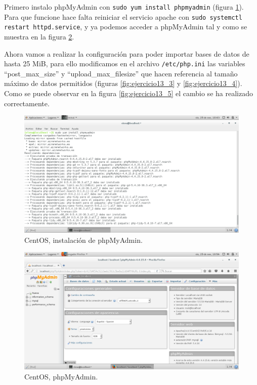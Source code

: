 Primero instalo phpMyAdmin con \texttt{sudo yum install phpmyadmin} (figura \ref{fig:ejercicio13_1}). Para que funcione hace falta reiniciar el servicio apache con \texttt{sudo systemctl restart httpd.service}, y ya podemos acceder a phpMyAdmin tal y como se muestra en la figura  \ref{fig:ejercicio13_2}.

Ahora vamos a realizar la configuración para poder importar bases de datos de hasta 25 MiB, para ello modificamos en el archivo \texttt{/etc/php.ini} las variables ``post\_max\_size'' y ``upload\_max\_filesize'' que hacen referencia al tamaño máximo de datos permitidos (figuras \ref{fig:ejercicio13_3} y \ref{fig:ejercicio13_4}). Como se puede observar en la figura \ref{fig:ejercicio13_5} el cambio se ha realizado correctamente.




\begin{figure}[H] 
	\centering
	\includegraphics[width=15cm]{./img/ejercicio13_1.png} 	
	\caption{CentOS, instalación de phpMyAdmin.} \label{fig:ejercicio13_1}
\end{figure}

\begin{figure}[H] 
	\centering
	\includegraphics[width=15cm]{./img/ejercicio13_2.png} 	
	\caption{CentOS, phpMyAdmin.} \label{fig:ejercicio13_2}
\end{figure}

